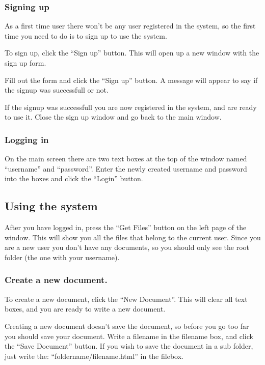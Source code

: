 \documentclass[11pt,a4paper]{article}
\begin{document}
\subsubsection{Signing up}
\label{sec-1-1-2}

    As a first time user there won't be any user registered in the system, so the first time you need
    to do is to sign up to use the system.

    To sign up, click the ``Sign up'' button. This will open up a new window with the sign up form.

    Fill out the form and click the ``Sign up'' button. A message will appear to say if the signup
    was successfull or not.

    If the signup was successfull you are now registered in the system, and are ready to use it. 
    Close the sign up window and go back to the main window.
\subsubsection{Logging in}
\label{sec-1-1-3}

    On the main screen there are two text boxes at the top of the window named ``username'' and ``password''.
    Enter the newly created username and password into the boxes and click the ``Login'' button.
\subsection{Using the system}
\label{sec-1-2}

   After you have logged in, press the ``Get Files'' button on the left page of the window. 
   This will show you all the files that belong to the current user. Since you are a new user you don't 
   have any documents, so you should only see the root folder (the one with your username).
\subsubsection{Create a new document.}
\label{sec-1-2-1}

    To create a new document, click the ``New Document''. This will clear all text boxes, and you are ready
    to write a new document.

    Creating a new document doesn't save the document, so before you go too far you should save your document.
    Write a filename in the filename box, and click the ``Save Document'' button.
    If you wish to save the document in a sub folder, just write the: ``foldername/filename.html'' in the filebox.
\end{document}
